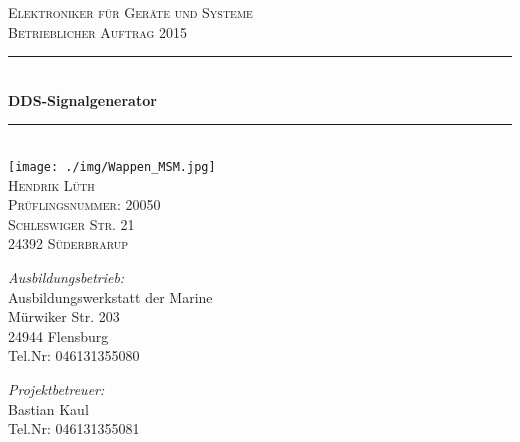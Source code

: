 \begin{center}
\textsc{\LARGE Elektroniker für Geräte und Systeme \\[0.5cm] Betrieblicher Auftrag 2015}\\[1cm]

\newcommand{\HRule}{\rule{\linewidth}{0.5mm}}
\HRule \\[0.4cm]
{ \huge \bfseries DDS-Signalgenerator}\\[0.4cm]

\HRule \\[1cm]

\texttt{[image: ./img/Wappen\_MSM.jpg]}\\[1cm]    

\textsc{\LARGE Hendrik Lüth \\ Prüflingsnummer: 20050}\\[0.5cm]

\textsc{\Large Schleswiger Str. 21 \\ 24392 Süderbrarup}\\[1.5cm]

\hfill


\begin{minipage}{0.5\textwidth}
\begin{flushleft} \large
\emph{Ausbildungsbetrieb:}\\
Ausbildungswerkstatt der Marine\\
Mürwiker Str. 203\\
24944 Flensburg\\
Tel.Nr: 046131355080
\end{flushleft}
\end{minipage}
\hfill
\begin{minipage}{0.4\textwidth}
\begin{flushright} \large
\hfill
\emph{Projektbetreuer:} \\
Bastian Kaul\\
Tel.Nr: 046131355081
\end{flushright}
\end{minipage}

\end{center}
\pagebreak
~ \\